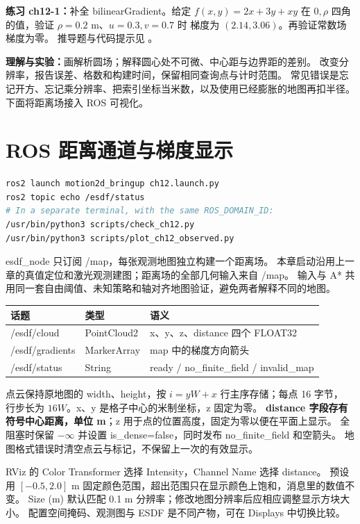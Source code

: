 \textbf{练习 ch12-1：}补全 bilinearGradient。给定
$f(x,y)=2x+3y+xy$ 在 $0,\rho$ 四角的值，验证 $\rho=0.2$ m、$u=0.3,v=0.7$ 时
梯度为 $(2.14,3.06)$。再验证常数场梯度为零。
推导题与代码提示见 。

\textbf{理解与实验：}画解析圆场；解释圆心处不可微、中心距与边界距的差别。
改变分辨率，报告误差、格数和构建时间，保留相同查询点与计时范围。
常见错误是忘记开方、忘记乘分辨率、把索引坐标当米数，以及使用已经膨胀的地图再扣半径。
下面将距离场接入 ROS 可视化。

\section{ROS 距离通道与梯度显示}
\begin{lstlisting}[language=bash]
ros2 launch motion2d_bringup ch12.launch.py
ros2 topic echo /esdf/status
# In a separate terminal, with the same ROS_DOMAIN_ID:
/usr/bin/python3 scripts/check_ch12.py
/usr/bin/python3 scripts/plot_ch12_observed.py
\end{lstlisting}
esdf\_node 只订阅 /map，每张观测地图独立构建一个距离场。
本章启动沿用上一章的真值定位和激光观测建图；距离场的全部几何输入来自 /map。
输入与 A* 共用同一套自由阈值、未知策略和轴对齐地图验证，避免两者解释不同的地图。

\begin{center}\small
\begin{tabular}{lll}\toprule
话题 & 类型 & 语义 \\\midrule
/esdf/cloud & PointCloud2 & x、y、z、distance 四个 FLOAT32 \\
/esdf/gradients & MarkerArray & map 中的梯度方向箭头 \\
/esdf/status & String & ready / no\_finite\_field / invalid\_map \\\bottomrule
\end{tabular}
\end{center}
点云保持原地图的 width、height，按 $i=yW+x$ 行主序存储；每点 16 字节，
行步长为 $16W$。x、y 是格子中心的米制坐标，z 固定为零。
\textbf{distance 字段存有符号中心距离，单位 m}；z 用于点的位置高度，固定为零以便在平面上显示。
全阻塞时保留 $-\infty$ 并设置 is\_dense=false，同时发布 no\_finite\_field 和空箭头。
地图格式错误时清空点云与标记，不保留上一次的有效显示。

RViz 的 Color Transformer 选择 Intensity，Channel Name 选择 distance。
预设用 $[-0.5,2.0]$ m 固定颜色范围，超出范围只在显示颜色上饱和，消息里的数值不变。
Size (m) 默认匹配 0.1 m 分辨率；修改地图分辨率后应相应调整显示方块大小。
配置空间掩码、观测图与 ESDF 是不同产物，可在 Displays 中切换比较。


